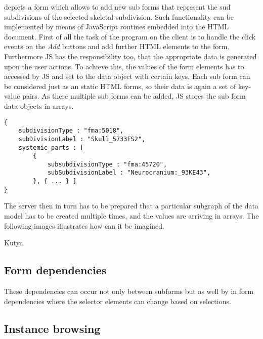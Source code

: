 

 depicts a form which allows to add new sub forms that represent the sud subdivisions of the selected skeletal subdivision. Such functionality can be implemented by means of JavaScript routines embedded into the HTML document. First of all the task of the program on the client is to handle the click events on the \textit{Add} buttons and add further HTML elements to the form. Furthermore JS has the responsibility too, that the appropriate data is generated upon the user actions. To achieve this, the values of the form elements has to accessed by JS and set to the data object with certain keys. Each sub form can be considered just as an static HTML forms, so their data is again a set of key-value pairs. As there multiple sub forms can be added, JS stores the sub form data objects in arrays.

\begin{lstlisting}[captionpos=b, caption=JSON object generated by the form, label=332L1,
basicstyle=\footnotesize,frame=single]
{
	subdivisionType : "fma:5018",
	subDivisionLabel : "Skull_5733FS2",
	systemic_parts : [
		{
			subsubdivisionType : "fma:45720",
			subSubdivisionLabel : "Neurocranium:_93KE43",
		}, { ... } ]
}
\end{lstlisting}



The server then in turn has to be prepared that a particular subgraph of the data model has to be created multiple times, and the values are arriving in arrays. The following images illustrates how can it be imagined.



Kutya


\subsection{Form dependencies} \label{formDependencies}



These dependencies can occur not only between subforms but as well by in form dependencies where the selector elements can change based on selections.

\subsection{Instance browsing}


